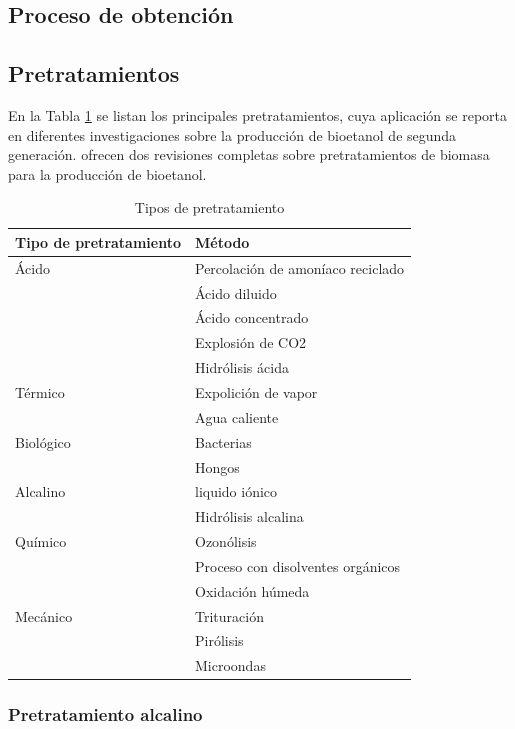 \documentclass[12pt]{article}
\begin{document}
		\subsection{Proceso de obtención }		
		
		\subsection{Pretratamientos}
		En la Tabla \ref{tipos de pretratamientos} se listan los principales pretratamientos, cuya aplicación se reporta en diferentes investigaciones sobre la producción de bioetanol de segunda generación.%
		ofrecen dos revisiones completas sobre pretratamientos de biomasa para la producción de bioetanol.
		
		\begin{table}[H]
		\centering  
		\caption{Tipos de pretratamiento }%
		\begin{tabular}{  | p{5cm} | p{6.5cm} |}
		\hline\textbf{ Tipo de pretratamiento} & \textbf{ Método}\\ \hline 
		Ácido     & Percolación de amoníaco reciclado  \\ 
		&  Ácido diluido  \\
		&  Ácido concentrado \\
		&   Explosión de CO2  \\ 
		&   Hidrólisis ácida \\ \hline 
		Térmico   & Expolición de vapor\\
		&  Agua caliente \\ \hline
		Biológico & Bacterias \\
		&  Hongos \\ \hline
		Alcalino  & liquido iónico  \\
		& Hidrólisis alcalina \\ \hline
		Químico   & Ozonólisis\\
		&  Proceso con disolventes orgánicos\\
		& Oxidación húmeda \\ \hline
		Mecánico  & Trituración \\
		&  Pirólisis \\
		&  Microondas \\ \hline
		
		\end{tabular}
		\label{tipos de pretratamientos}
	\end{table}


\subsubsection{Pretratamiento alcalino}
\end{document}
